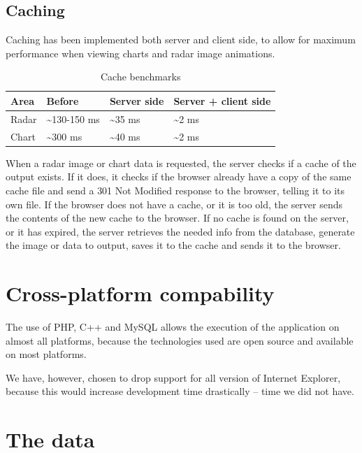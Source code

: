 \subsection{Caching}
Caching has been implemented both server and client side, to allow for maximum performance when viewing charts and radar image animations.

\begin{table}[htbp]
\centering
\begin{tabular}{|l|l|l|l|}
\hline
\textbf{Area} & \textbf{Before} & \textbf{Server side} & \textbf{Server + client side}\\
\hline
Radar & \textasciitilde 130-150 ms & \textasciitilde 35 ms & \textasciitilde 2 ms\\
\hline
Chart & \textasciitilde 300 ms & \textasciitilde 40 ms & \textasciitilde 2 ms\\
\hline
\end{tabular}
\label{tab:cache_benchmarks}
\caption{Cache benchmarks}
\end{table}

When a radar image or chart data is requested, the server checks if a cache of the output exists. If it does, it checks if the browser already have a copy of the same cache file and send a \textsf{301 Not Modified} response to the browser, telling it to its own file.
If the browser does not have a cache, or it is too old, the server sends the contents of the new cache to the browser.
If no cache is found on the server, or it has expired, the server retrieves the needed info from the database, generate the image or data to output, saves it to the cache and sends it to the browser.

\section{Cross-platform compability}
\label{sec:cross-platform}
The use of PHP, C++ and MySQL allows the execution of the application on almost all platforms, because the technologies used are open source and available on most platforms.

We have, however, chosen to drop support for all version of Internet Explorer, because this would increase development time drastically -- time we did not have.

\section{The data}
